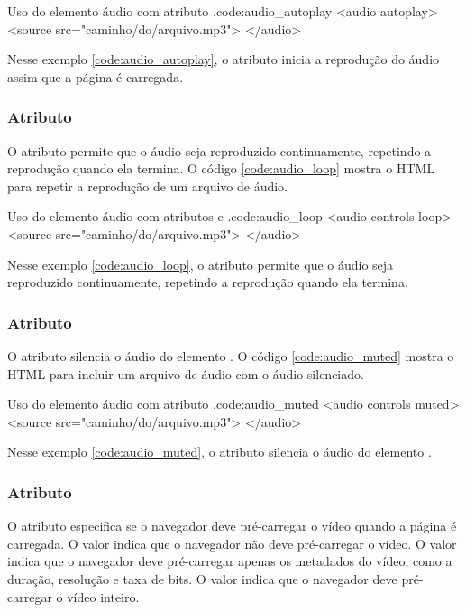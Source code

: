 \begin{htmlcode}{Uso do elemento áudio com atributo .}{code:audio_autoplay}
<audio autoplay>
  <source src="caminho/do/arquivo.mp3">
</audio>
\end{htmlcode}

Nesse exemplo \ref{code:audio_autoplay}, o atributo  inicia a reprodução do áudio assim que a página é carregada.

\subsubsection{Atributo }

O atributo  permite que o áudio seja reproduzido continuamente, repetindo a reprodução quando ela termina. O código \ref{code:audio_loop} mostra o HTML para repetir a reprodução de um arquivo de áudio.

\begin{htmlcode}{Uso do elemento áudio com atributos  e .}{code:audio_loop}
<audio controls loop>
  <source src="caminho/do/arquivo.mp3">
</audio>
\end{htmlcode}

Nesse exemplo \ref{code:audio_loop}, o atributo  permite que o áudio seja reproduzido continuamente, repetindo a reprodução quando ela termina.

\subsubsection{Atributo }

O atributo  silencia o áudio do elemento . O código \ref{code:audio_muted} mostra o HTML para incluir um arquivo de áudio com o áudio silenciado.

\begin{htmlcode}{Uso do elemento áudio com atributo .}{code:audio_muted}
<audio controls muted>
  <source src="caminho/do/arquivo.mp3">
</audio>
\end{htmlcode}

Nesse exemplo \ref{code:audio_muted}, o atributo  silencia o áudio do elemento .

\subsubsection{Atributo }

O atributo  especifica se o navegador deve pré-carregar o vídeo quando a página é carregada. O valor  indica que o navegador não deve pré-carregar o vídeo. O valor  indica que o navegador deve pré-carregar apenas os metadados do vídeo, como a duração, resolução e taxa de bits. O valor  indica que o navegador deve pré-carregar o vídeo inteiro.

